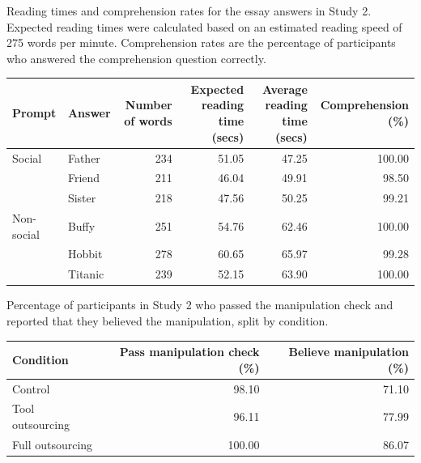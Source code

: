 \documentclass[
  man,
  floatsintext,
  longtable,
  nolmodern,
  notxfonts,
  notimes,
  colorlinks=true,linkcolor=blue,citecolor=blue,urlcolor=blue]{apa7}
\begin{document}
\begin{supptbl}[H]
\begin{minipage}{\linewidth}
\end{minipage}%

\end{supptbl}%

\newpage

\begin{supptbl}[H]

\caption{\label{supptbl-essay-comprehension-study2}Reading times and
comprehension rates for the essay answers in Study 2. Expected reading
times were calculated based on an estimated reading speed of 275 words
per minute. Comprehension rates are the percentage of participants who
answered the comprehension question correctly.}

\begin{minipage}{\linewidth}

\centering\begingroup\fontsize{9}{11}\selectfont

\begin{tabular}{llrrrr}
\toprule
Prompt & Answer & Number of words & Expected reading time (secs) & Average reading time (secs) & Comprehension (\%)\\
\midrule
Social & Father & 234 & 51.05 & 47.25 & 100.00\\
 & Friend & 211 & 46.04 & 49.91 & 98.50\\
 & Sister & 218 & 47.56 & 50.25 & 99.21\\
Non-social & Buffy & 251 & 54.76 & 62.46 & 100.00\\
 & Hobbit & 278 & 60.65 & 65.97 & 99.28\\
 & Titanic & 239 & 52.15 & 63.90 & 100.00\\
\bottomrule
\end{tabular}
\endgroup{}

\end{minipage}%

\end{supptbl}%

\newpage

\begin{supptbl}[H]

\caption{\label{supptbl-manipulation-check-study2}Percentage of
participants in Study 2 who passed the manipulation check and reported
that they believed the manipulation, split by condition.}

\begin{minipage}{\linewidth}

\centering\begingroup\fontsize{11}{13}\selectfont

\begin{tabular}{lrr}
\toprule
Condition & Pass manipulation check (\%) & Believe manipulation (\%)\\
\midrule
Control & 98.10 & 71.10\\
Tool outsourcing & 96.11 & 77.99\\
Full outsourcing & 100.00 & 86.07\\
\bottomrule
\end{tabular}
\endgroup{}

\end{minipage}%

\end{supptbl}%
\end{document}
